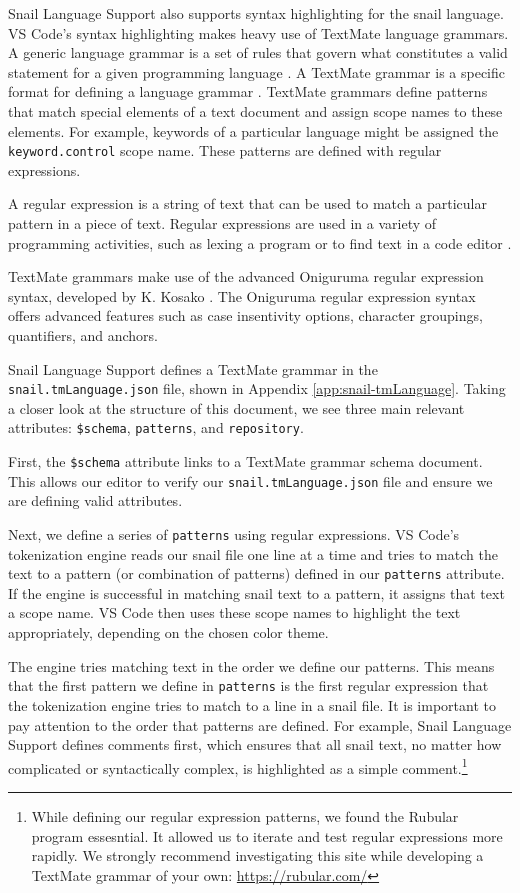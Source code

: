 \documentclass{article}
\begin{document}
Snail Language Support also supports syntax highlighting for the snail language. VS Code's syntax highlighting makes heavy use of TextMate language grammars. A generic language grammar is a set of rules that govern what constitutes a valid statement for a given programming language \cite{pgrandinetti_2019}. A TextMate grammar is a specific format for defining a language grammar \cite{MacroMates_2021a}. TextMate grammars define patterns that match special elements of a text document and assign scope names to these elements. For example, keywords of a particular language might be assigned the \lstinline{keyword.control} scope name. These patterns are defined with regular expressions. 

A regular expression is a string of text that can be used to match a particular pattern in a piece of text. Regular expressions are used in a variety of programming activities, such as lexing a program or to find text in a code editor \cite{ComputerHope_2022, Cornell_2022}. 

TextMate grammars make use of the advanced Oniguruma regular expression syntax, developed by K. Kosako \cite{Microsoft_2023h, MacroMates_2021b}. The Oniguruma regular expression syntax offers advanced features such as case insentivity options, character groupings, quantifiers, and anchors. 

Snail Language Support defines a TextMate grammar in the \lstinline{snail.tmLanguage.json} file, shown in Appendix \ref{app:snail-tmLanguage}. Taking a closer look at the structure of this document, we see three main relevant attributes: \lstinline{$schema}, \lstinline{patterns}, and \lstinline{repository}. 

First, the \lstinline{$schema} attribute links to a TextMate grammar schema document. This allows our editor to verify our \lstinline{snail.tmLanguage.json} file and ensure we are defining valid attributes.

Next, we define a series of \lstinline{patterns} using regular expressions.  VS Code's tokenization engine reads our snail file one line at a time and tries to match the text to a pattern (or combination of patterns) defined in our \lstinline{patterns} attribute. If the engine is successful in matching snail text to a pattern, it assigns that text a scope name. VS Code then uses these scope names to highlight the text appropriately, depending on the chosen color theme. 

The engine tries matching text in the order we define our patterns. This means that the first pattern we define in \lstinline{patterns} is the first regular expression that the tokenization engine tries to match to a line in a snail file. It is important to pay attention to the order that patterns are defined. For example, Snail Language Support defines comments first, which ensures that all snail text, no matter how complicated or syntactically complex, is highlighted as a simple comment.\footnote{While defining our regular expression patterns, we found the Rubular program essesntial. It allowed us to iterate and test regular expressions more rapidly. We strongly recommend investigating this site while developing a TextMate grammar of your own: \url{https://rubular.com/}} 
\end{document}
